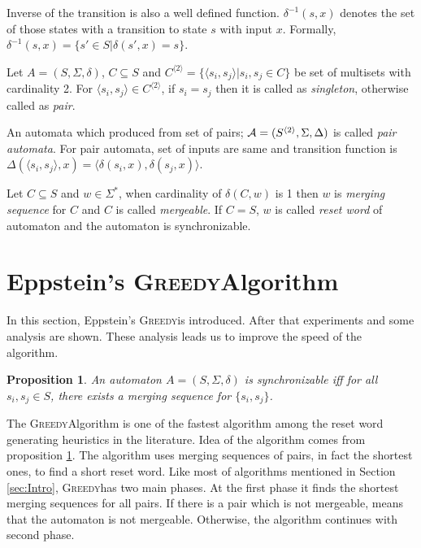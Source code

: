 \documentclass[12pt]{article}
\newtheorem{proposition}{Proposition}[section]
\newcommand{\comment}[2]{{\color{red}{\bf (#1: #2)}}}
\newcommand{\greedyAlgo}{\textsc{Greedy}}
\begin{document}
Inverse of the transition is also a well defined function. $\delta^{-1}(s,x)$ denotes the set of those states with a transition to state $s$ with input $x$. Formally, $\delta^{-1}(s,x) = \{ s' \in S | \delta(s',x)= s\}$.

Let $A=(S, \Sigma, \delta)$, $C \subseteq S$ and $C^{\langle 2 \rangle} = \{ \langle s_i, s_j \rangle | s_i,s_j \in C \}$ be set of multisets  with cardinality 2. For $\langle s_i, s_j \rangle \in C^{\langle 2 \rangle}$, if $s_i=s_j$ then it is called as \textit{singleton}, otherwise called as \textit{pair}. 

An automata which produced from set of pairs; ${\cal A}=(S^{\langle 2 \rangle},\Sigma,\Delta)$ is called \textit{pair automata}. For pair automata, set of inputs are same and transition function is $\Delta(\langle s_i,s_j \rangle,x) = \langle \delta(s_i,x), \delta(s_j,x)\rangle$. \comment{sertac}{pair automata icin figure cizilebilir}

Let $C \subseteq S$ and $w \in \Sigma^*$, when cardinality of $\delta(C,w)$ is 1 then $w$ is \textit{merging sequence} for $C$ and $C$ is called \textit{mergeable}. If $C=S$, $w$ is called \textit{reset word} of automaton and the automaton is synchronizable.

\clearpage
\section{Eppstein's \greedyAlgo \space Algorithm}
\label{sec:greedy}
In this section, Eppstein's \greedyAlgo \space is introduced. After that experiments and some analysis are shown. These analysis leads us to improve the speed of the algorithm.

\begin{proposition}
	\label{prop:synchronizable}
	An automaton $A=(S,\Sigma,\delta)$ is synchronizable iff for all  $s_i,s_j \in S$, there exists a merging sequence for $\{ s_i, s_j \}$.
\end{proposition}

The \greedyAlgo \space Algorithm is one of the fastest algorithm among the reset word generating heuristics in the literature. Idea of the algorithm comes from proposition \ref{prop:synchronizable}. The algorithm uses merging sequences of pairs, in fact the shortest ones, to find a short reset word. Like most of algorithms mentioned in Section \ref{sec:Intro}, \greedyAlgo \space has two main phases. At the first phase it finds the shortest merging sequences for all pairs. If there is a pair which is not mergeable, means that the automaton is not mergeable. Otherwise, the algorithm continues with second phase.
\end{document}
